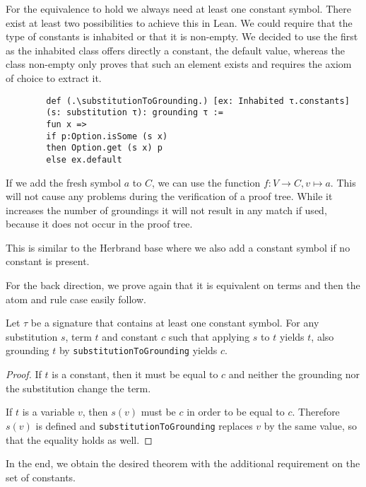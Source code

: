     For the equivalence to hold we always need at least one constant symbol. There exist at least two possibilities to achieve this in Lean. We could require that the type of constants is inhabited or that it is non-empty. We decided to use the first as the inhabited class offers directly a constant, the default value, whereas the class non-empty only proves that such an element exists and requires the axiom of choice to extract it.

    \begin{lstlisting}
        def (.\substitutionToGrounding.) [ex: Inhabited τ.constants] 
        (s: substitution τ): grounding τ :=
        fun x => 
        if p:Option.isSome (s x) 
        then Option.get (s x) p 
        else ex.default
    \end{lstlisting}

    \begin{contexample}
        If we add the fresh symbol $a$ to $C$, we can use the function $f: V \to C, v \mapsto a$. This will not cause any problems during the verification of a proof tree. While it increases the number of groundings it will not result in any match if used, because it does not occur in the proof tree.
    \end{contexample}

    This is similar to the Herbrand base where we also add a constant symbol if no constant is present.

    For the back direction, we prove again that it is equivalent on terms and then the atom and rule case easily follow.

    \begin{lemma}[\substitutionToGroundingEquivTerm]
        Let $\tau$ be a signature that contains at least one constant symbol. For any substitution $s$, term $t$ and constant $c$ such that applying $s$ to $t$ yields $t$, also grounding $t$ by \lstinline|substitutionToGrounding| yields $c$.
    \end{lemma}
    \begin{proof}
        If $t$ is a constant, then it must be equal to $c$ and neither the grounding nor the substitution change the term.

        If $t$ is a variable $v$, then $s(v)$ must be $c$ in order to be equal to $c$. Therefore $s(v)$ is defined and \lstinline|substitutionToGrounding| replaces $v$ by the same value, so that the equality holds as well.
    \end{proof}

    In the end, we obtain the desired theorem with the additional requirement on the set of constants.

